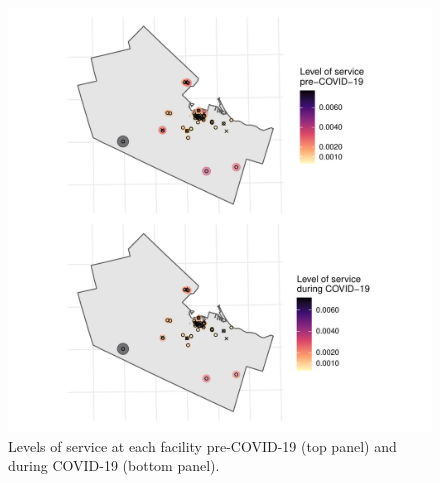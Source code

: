 \documentclass[]{elsarticle} %
\providecommand{\DIFdelbegin}{} %
\providecommand{\DIFdelend}{} %
\providecommand{\DIFmodbegin}{} %
\providecommand{\DIFmodend}{} %
\providecommand{\DIFaddbeginFL}{} %
\providecommand{\DIFaddendFL}{} %
\providecommand{\DIFdelbeginFL}{} %
\providecommand{\DIFdelendFL}{} %
\newcommand{\DIFscaledelfig}{0.5}
\newlength{\DIFdelgraphicswidth} %
\newlength{\DIFdelgraphicsheight} %
\newcommand{\DIFaddincludegraphics}[2][]{{\color{blue}\fbox{\DIFOincludegraphics[#1]{#2}}}} %
\newcommand{\DIFdelincludegraphics}[2][]{%
\sbox{\DIFdelgraphicsbox}{\DIFOincludegraphics[#1]{#2}}%
\settoboxwidth{\DIFdelgraphicswidth}{\DIFdelgraphicsbox} %
\settoboxtotalheight{\DIFdelgraphicsheight}{\DIFdelgraphicsbox} %
\scalebox{\DIFscaledelfig}{%
\parbox[b]{\DIFdelgraphicswidth}{\usebox{\DIFdelgraphicsbox}\\[-\baselineskip] \rule{\DIFdelgraphicswidth}{0em}}\llap{\resizebox{\DIFdelgraphicswidth}{\DIFdelgraphicsheight}{%
\setlength{\unitlength}{\DIFdelgraphicswidth}%
\begin{picture}(1,1)%
\thicklines\linethickness{2pt} %
{\color[rgb]{1,0,0}\put(0,0){\framebox(1,1){}}}%
{\color[rgb]{1,0,0}\put(0,0){\line( 1,1){1}}}%
{\color[rgb]{1,0,0}\put(0,1){\line(1,-1){1}}}%
\end{picture}%
}\hspace*{3pt}}} %
} %
\DeclareRobustCommand{\DIFdelbegin}{\DIFOdelbegin \let\includegraphics\DIFdelincludegraphics} %
\DeclareRobustCommand{\DIFdelend}{\DIFOaddend \let\includegraphics\DIFOincludegraphics} %
\DeclareRobustCommand{\DIFaddbeginFL}{\DIFOaddbeginFL \let\includegraphics\DIFaddincludegraphics} %
\DeclareRobustCommand{\DIFaddendFL}{\DIFOaddendFL \let\includegraphics\DIFOincludegraphics} %
\DeclareRobustCommand{\DIFdelbeginFL}{\DIFOdelbeginFL \let\includegraphics\DIFdelincludegraphics} %
\DeclareRobustCommand{\DIFdelendFL}{\DIFOaddendFL \let\includegraphics\DIFOincludegraphics} %
\begin{document}
\DIFdelend \begin{figure}
\DIFdelbeginFL %
\DIFdelendFL \DIFaddbeginFL \includegraphics[width=1\linewidth]{Accessibility-Foodbanks-Hamilton_files/figure-latex/plot-levels-of-service-1} \DIFaddendFL \caption{\label{fig:levels-of-service}Levels of service at each facility pre-COVID-19 (top panel) and during COVID-19 (bottom panel).}\label{fig:plot-levels-of-service}
\end{figure}

\DIFdelbegin %
\DIFmodbegin
\begin{DIFverbatim}[alsolanguage=DIFcode]
\end{DIFverbatim}
\DIFmodend %
\end{document}
